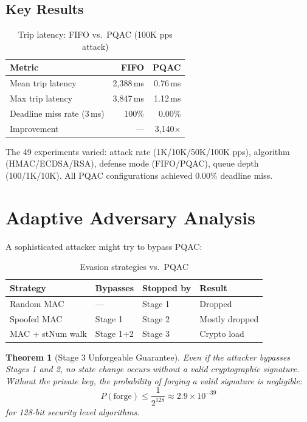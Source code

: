 \documentclass[11pt,a4paper,twocolumn]{article}
\newtheorem{theorem}{Theorem}
\begin{document}
\subsection{Key Results}

\begin{table}[H]
\centering
\caption{Trip latency: FIFO vs.\ PQAC (100K pps attack)}
\scriptsize
\begin{tabular}{@{}lrr@{}}
\toprule
\textbf{Metric} & \textbf{FIFO} & \textbf{PQAC} \\
\midrule
Mean trip latency & 2{,}388\,ms & 0.76\,ms \\
Max trip latency & 3{,}847\,ms & 1.12\,ms \\
Deadline miss rate (3\,ms) & 100\% & 0.00\% \\
Improvement & --- & 3{,}140$\times$ \\
\bottomrule
\end{tabular}
\end{table}

The 49 experiments varied: attack rate (1K/10K/50K/100K pps), algorithm (HMAC/ECDSA/RSA), defense mode (FIFO/PQAC), queue depth (100/1K/10K). All PQAC configurations achieved 0.00\% deadline miss.

\section{Adaptive Adversary Analysis}
\label{sec:adaptive}

A sophisticated attacker might try to bypass PQAC:

\begin{table}[H]
\centering
\caption{Evasion strategies vs.\ PQAC}
\scriptsize
\begin{tabular}{@{}llll@{}}
\toprule
\textbf{Strategy} & \textbf{Bypasses} & \textbf{Stopped by} & \textbf{Result} \\
\midrule
Random MAC & --- & Stage 1 & Dropped \\
Spoofed MAC & Stage 1 & Stage 2 & Mostly dropped \\
MAC + stNum walk & Stage 1+2 & Stage 3 & Crypto load \\
\bottomrule
\end{tabular}
\end{table}

\begin{theorem}[Stage 3 Unforgeable Guarantee]
Even if the attacker bypasses Stages 1 and 2, no state change occurs without a valid cryptographic signature. Without the private key, the probability of forging a valid signature is negligible:
\begin{equation}
P(\text{forge}) \leq \frac{1}{2^{128}} \approx 2.9 \times 10^{-39}
\end{equation}
for 128-bit security level algorithms.
\end{theorem}
\end{document}
